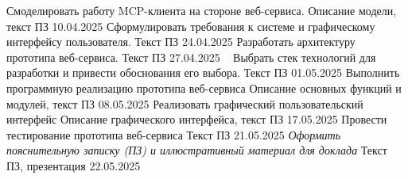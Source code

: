{  \projecttask{\projectsubtasknum}
  {Смоделировать работу MCP-клиента на стороне веб-сервиса.}%
  {Описание модели, текст ПЗ}%
  {10.04.2025}
  {
  }
  \projecttask{\projectsubtasknum}
  {
    Сформулировать требования к системе и
    графическому интерфейсу пользователя.
  }%
  {Текст ПЗ}%
  {24.04.2025}
  {
  }
  \projecttask{\projectsubtasknum}
  {Разработать архитектуру прототипа веб-сервиса.}%
  {Текст ПЗ}%
  {27.04.2025}
  {\
  }
  \projecttask{\projectsubtasknum}
  {
    Выбрать стек технологий для разработки и
    привести обоснования его выбора.
  }%
  {Текст ПЗ}%
  {01.05.2025}
  {
  }
  \projecttask{\projectsubtasknum}
  {Выполнить программную реализацию прототипа веб-сервиса}%
  {
    Описание основных функций и
    модулей, текст ПЗ
  }%
  {08.05.2025}
  {
  }
  \projecttask{\projectsubtasknum}
  {
    Реализовать графический пользовательский интерфейс
  }%
  {Описание графического интерфейса, текст ПЗ}%
  {17.05.2025}
  {
  }
  \projecttask{\projectsubtasknum}
  {
    Провести тестирование прототипа веб-сервиса
  }%
  {Текст ПЗ}%
  {21.05.2025}
  {
  }
  \projecttask{\bfseries\projecttasknum}
  {\itshape
    Оформить пояснительную записку (ПЗ) и
    иллюстративный материал для доклада
  }%
  {Текст ПЗ, презентация}%
  {22.05.2025}
  {
  }
}

